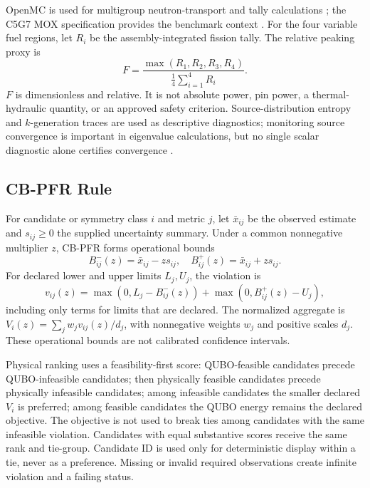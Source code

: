 \documentclass[conference]{IEEEtran}
\begin{document}
OpenMC is used for multigroup neutron-transport and tally calculations \cite{romano2015}; the C5G7 MOX specification provides the benchmark context \cite{nea2003}. For the four variable fuel regions, let \(R_i\) be the assembly-integrated fission tally. The relative peaking proxy is
\begin{equation}
F=\frac{\max(R_1,R_2,R_3,R_4)}
{\frac{1}{4}\sum_{i=1}^{4}R_i}.
\label{eq:fpeak}
\end{equation}
\(F\) is dimensionless and relative. It is not absolute power, pin power, a thermal-hydraulic quantity, or an approved safety criterion. Source-distribution entropy and \(k\)-generation traces are used as descriptive diagnostics; monitoring source convergence is important in eigenvalue calculations, but no single scalar diagnostic alone certifies convergence \cite{openmcguide}.

\subsection{CB-PFR Rule}
For candidate or symmetry class $i$ and metric $j$, let $\bar{x}_{ij}$ be the observed estimate and $s_{ij}\geq0$ the supplied uncertainty summary. Under a common nonnegative multiplier $z$, CB-PFR forms operational bounds
\begin{equation}
B_{ij}^{-}(z)=\bar{x}_{ij}-zs_{ij},\quad
B_{ij}^{+}(z)=\bar{x}_{ij}+zs_{ij}.
\label{eq:bounds}
\end{equation}
For declared lower and upper limits $L_j,U_j$, the violation is
\begin{equation}
v_{ij}(z)=\max(0,L_j-B_{ij}^{-}(z))+\max(0,B_{ij}^{+}(z)-U_j),
\end{equation}
including only terms for limits that are declared. The normalized aggregate is $V_i(z)=\sum_j w_jv_{ij}(z)/d_j$, with nonnegative weights $w_j$ and positive scales $d_j$. These operational bounds are not calibrated confidence intervals.

Physical ranking uses a feasibility-first score: QUBO-feasible candidates precede QUBO-infeasible candidates; then physically feasible candidates precede physically infeasible candidates; among infeasible candidates the smaller declared $V_i$ is preferred; among feasible candidates the QUBO energy remains the declared objective. The objective is not used to break ties among candidates with the same infeasible violation. Candidates with equal substantive scores receive the same rank and tie-group. Candidate ID is used only for deterministic display within a tie, never as a preference. Missing or invalid required observations create infinite violation and a failing status.
\end{document}
